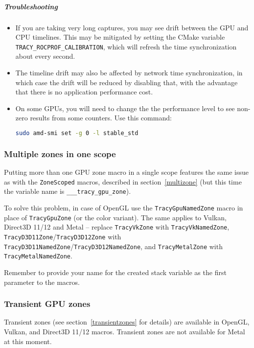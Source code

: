 \documentclass[hidelinks,titlepage,a4paper,twoside]{article}
\begin{document}
\subparagraph{Troubleshooting}
\begin{itemize}
\item If you are taking very long captures, you may see drift between the GPU and
  CPU timelines. This may be mitigated by setting the CMake variable
  \texttt{TRACY\_ROCPROF\_CALIBRATION}, which will refresh the time synchronization about every
  second.
\item The timeline drift may also be affected by network time synchronization, in which case the
  drift will be reduced by disabling that, with the advantage that there is no application performance
  cost.
\item On some GPUs, you will need to change the the performance level to see non-zero results from
  some counters. Use this command:
\begin{lstlisting}[language=sh]
sudo amd-smi set -g 0 -l stable_std
\end{lstlisting}
\end{itemize}

\subsubsection{Multiple zones in one scope}

Putting more than one GPU zone macro in a single scope features the same issue as with the \texttt{ZoneScoped} macros, described in section~\ref{multizone} (but this time the variable name is \texttt{\_\_\_tracy\_gpu\_zone}).

To solve this problem, in case of OpenGL use the \texttt{TracyGpuNamedZone} macro in place of \texttt{TracyGpuZone} (or the color variant). The same applies to Vulkan, Direct3D 11/12 and Metal -- replace \texttt{TracyVkZone} with \texttt{TracyVkNamedZone}, \texttt{TracyD3D11Zone}/\texttt{TracyD3D12Zone} with \texttt{TracyD3D11NamedZone}/\texttt{TracyD3D12NamedZone}, and \texttt{TracyMetalZone} with \texttt{TracyMetalNamedZone}.

Remember to provide your name for the created stack variable as the first parameter to the macros.

\subsubsection{Transient GPU zones}

Transient zones (see section~\ref{transientzones} for details) are available in OpenGL, Vulkan, and Direct3D 11/12 macros. Transient zones are not available for Metal at this moment.
\end{document}
